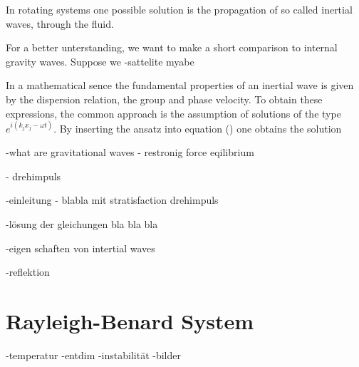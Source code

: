 In rotating systems one possible solution is the propagation of so called inertial waves, through the fluid.

For a better unterstanding, we want to make a short comparison to internal gravity waves.
Suppose we
-sattelite myabe

In a mathematical sence the fundamental properties of an inertial wave is given by the dispersion relation, the group and phase velocity.
To obtain these expressions, the common approach is the assumption of solutions of the type $e^{i(k_j x_j - \omega t)}$.
By inserting the ansatz into equation () one obtains the solution




-what are gravitational waves
- restronig force eqilibrium

- drehimpuls





-einleitung - blabla mit stratisfaction drehimpuls

-lösung der gleichungen  bla bla bla

-eigen schaften von intertial waves

-reflektion

\section{Rayleigh-Benard System}
-temperatur
-entdim
-instabilität
-bilder





